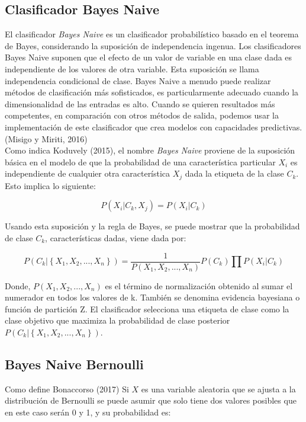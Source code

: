 \subsection{Clasificador Bayes Naive}

El clasificador \textit{Bayes Naive} es un clasificador probabilístico basado en el teorema de Bayes, considerando la suposición de independencia ingenua. Los clasificadores Bayes Naive suponen que el efecto de un valor de variable en una clase dada es independiente de los valores de otra variable. Esta suposición se llama independencia condicional de clase. Bayes Naive a menudo puede realizar métodos de clasificación más sofisticados, es particularmente adecuado cuando la dimensionalidad de las entradas es alto. Cuando se quieren resultados más competentes, en comparación con otros métodos de salida, podemos usar la implementación de este clasificador que crea modelos con capacidades predictivas.(Misigo y Miriti, 2016)\\

Como indica Koduvely (2015), el nombre \textit{Bayes Naive} proviene de la suposición básica en el modelo de que la probabilidad de una característica particular $X_{i}$ es independiente de cualquier otra característica $X_{j}$ dada la etiqueta de la clase $C_{k}$. Esto implica lo siguiente:

	\[P\left(X_{i}|C_{k},X_{j}\right)=P\left(X_{i}|C_{k}\right)
\]

Usando esta suposición y la regla de Bayes, se puede mostrar que la probabilidad de clase $C_{k}$, características dadas, viene dada por:

	\[P\left(C_{k}|\left\{X_{1},X_{2},...,X_{n}\right\}\right)=\frac{1}{P\left(X_{1},X_{2},...,X_{n}\right)}P\left(C_{k}\right)\prod{P\left(X_{i}|C_{k}\right)}
\]

Donde, $P\left(X_{1},X_{2},...,X_{n}\right)$ es el término de normalización obtenido al sumar el numerador en todos los valores de k. También se denomina evidencia bayesiana o función de partición Z. El clasificador selecciona una etiqueta de clase como la clase objetivo que maximiza la probabilidad de clase posterior $P\left(C_{k}|\left\{X_{1},X_{2},...,X_{n}\right\}\right)$.

\subsection{Bayes Naive Bernoulli}

Como define Bonaccorso (2017) Si $X$ es una variable aleatoria que se ajusta a la distribución de Bernoulli se puede asumir que solo tiene dos valores posibles que en este caso serán 0 y 1, y su probabilidad es:

